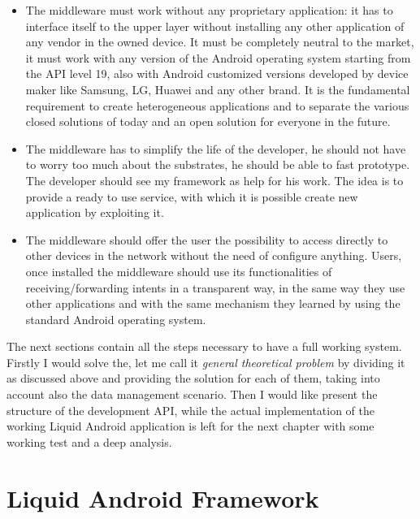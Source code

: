 \begin{itemize}
	\item The middleware must work without any proprietary application: it has to interface itself to the upper layer without installing any other application of any vendor in the owned device. It must be completely neutral to the market, it must work with any version of the Android operating system starting from the API level 19, also with Android customized versions developed by device maker like Samsung, LG, Huawei and any other brand. It is the fundamental requirement to create heterogeneous applications and to separate the various closed solutions of today and an open solution for everyone in the future.
	\item The middleware has to simplify the life of the developer, he should not have to worry too much about the substrates, he should be able to fast prototype. The developer should see my framework as help for his work. The idea is to provide a ready to use service, with which it is possible create new application by exploiting it.
	\item The middleware should offer the user the possibility to access directly to other devices in the network without the need of configure anything. Users, once installed the middleware should use its functionalities of receiving/forwarding intents in a transparent way, in the same way they use other applications and with the same mechanism they learned by using the standard Android operating system.
\end{itemize}
The next sections contain all the steps necessary to have a full working system.
Firstly I would solve the, let me call it \textit{general theoretical problem} by dividing it as discussed above and providing the solution for each of them, taking into account also the data management scenario. Then I would like present the structure of the development API, while the actual implementation of the working Liquid Android application is left for the next chapter with some working test and a deep analysis.



\section{Liquid Android Framework}



%
